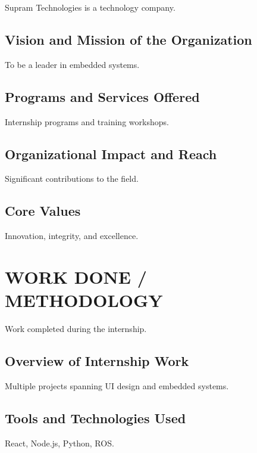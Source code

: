 \documentclass[12pt,a4paper]{report}
\begin{document}
Supram Technologies is a technology company.




\section{Vision and Mission of the Organization}

To be a leader in embedded systems.


\section{Programs and Services Offered}

Internship programs and training workshops.


\section{Organizational Impact and Reach}

Significant contributions to the field.


\section{Core Values}

Innovation, integrity, and excellence.




\chapter{WORK DONE / METHODOLOGY}
\label{ch:work}


Work completed during the internship.


\section{Overview of Internship Work}

Multiple projects spanning UI design and embedded systems.


\section{Tools and Technologies Used}

React, Node.js, Python, ROS.
\end{document}
